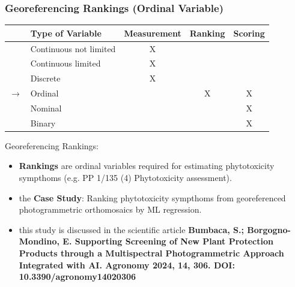\documentclass[aspectratio=43]{beamer}
\begin{document}
\begin{frame}
    \frametitle{Georeferencing Rankings (Ordinal Variable)}
    \begin{table}[ht]
        \centering
        \begin{tabular}{|c|l|c|c|c|}
        \hline
        & \textbf{Type of Variable} & \textbf{Measurement} & \textbf{Ranking} & \textbf{Scoring} \\
        \hline
        \rowcolor{green!20} & Continuous not limited & X & & \\
        \hline
        \rowcolor{green!20} & Continuous limited & X & & \\
        \hline
        \rowcolor{yellow!20} & Discrete & X & & \\
        \hline
        \rowcolor{red!20} $\rightarrow$ & Ordinal & & X & X \\
        \hline
        \rowcolor{red!20} & Nominal & & & X \\
        \hline
        \rowcolor{red!20} & Binary & & & X \\
        \hline
        \end{tabular}
    \end{table}
    \begin{block}{Georeferencing Rankings:}
        \small
        \begin{itemize}
            \item \textbf{Rankings} are ordinal variables required for estimating phytotoxicity sympthoms (e.g. PP 1/135 (4) Phytotoxicity assessment).
            \item the \textbf{Case Study}: Ranking phytotoxicity sympthoms from georeferenced photogrammetric orthomosaics by ML regression. 
            \item this study is discussed in the scientific article \textbf{\scriptsize Bumbaca, S.; Borgogno-Mondino, E. Supporting Screening of New Plant Protection Products through a Multispectral Photogrammetric Approach Integrated with AI. Agronomy 2024, 14, 306. DOI: 10.3390/agronomy14020306}
        \end{itemize}
    \end{block}
\end{frame}


\end{document}
